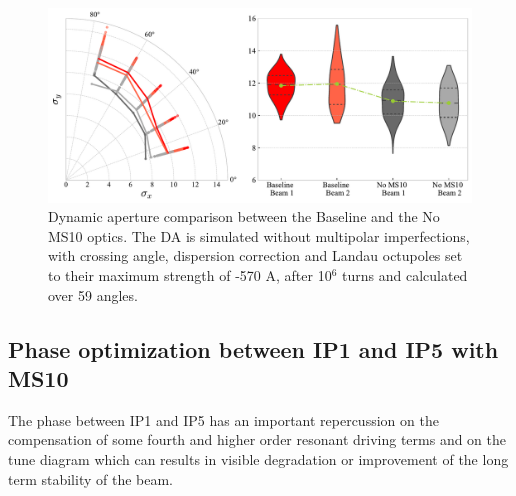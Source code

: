 \documentclass{cernatsnote}
\begin{document}
\begin{figure}[h!]
\centering
\includegraphics[width=1\textwidth]{images/da_imp_noms10.pdf}
\caption{\label{da_ms10} Dynamic aperture comparison between the Baseline and the No MS10 optics. The DA is simulated without multipolar imperfections, with crossing angle, dispersion correction and Landau octupoles set to their maximum strength of -570 A, after 10$^{6}$ turns and calculated over 59 angles. }
\end{figure}

\clearpage


\subsection{Phase optimization between IP1 and IP5 with MS10}

The phase between IP1 and IP5 has an important repercussion on the compensation of some fourth and higher order resonant driving terms and on the tune diagram which can results in visible degradation or improvement of the long term stability of the beam.   

\end{document}
